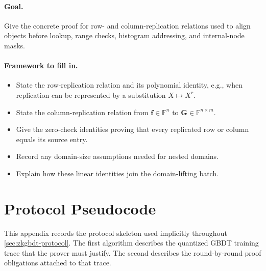 \paragraph{Goal.}
Give the concrete proof for row- and column-replication relations used to align
objects before lookup, range checks, histogram addressing, and internal-node
masks.

\paragraph{Framework to fill in.}
\begin{itemize}
    \item State the row-replication relation and its polynomial identity, e.g.,
    when replication can be represented by a substitution $X\mapsto X^r$.
    \item State the column-replication relation from
    $\mathbf{f}\in\mathbb{F}^n$ to
    $\mathbf{G}\in\mathbb{F}^{n\times m}$.
    \item Give the zero-check identities proving that every replicated row or
    column equals its source entry.
    \item Record any domain-size assumptions needed for nested domains.
    \item Explain how these linear identities join the domain-lifting batch.
\end{itemize}

\section{Protocol Pseudocode}\label{app:pseudocode}

This appendix records the protocol skeleton used implicitly throughout
\cref{sec:zkgbdt-protocol}. The first algorithm describes the quantized GBDT
training trace that the prover must justify. The second describes the
round-by-round proof obligations attached to that trace.

